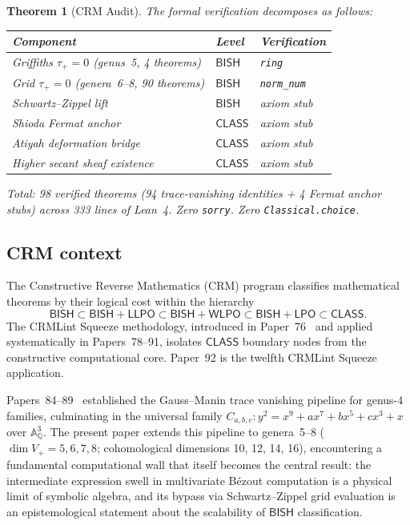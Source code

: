\documentclass[11pt]{article}
\theoremstyle{plain}
\newtheorem{theorem}{Theorem}[section]
\theoremstyle{definition}
\theoremstyle{remark}
\newcommand{\QQ}{\mathbb{Q}}
\newcommand{\Aff}{\mathbb{A}}
\newcommand{\BISH}{\mathsf{BISH}}
\newcommand{\LPO}{\mathsf{LPO}}
\newcommand{\WLPO}{\mathsf{WLPO}}
\newcommand{\LLPO}{\mathsf{LLPO}}
\newcommand{\CLASS}{\mathsf{CLASS}}
\begin{document}
\begin{theorem}[CRM Audit]\label{thm:D}
The formal verification decomposes as follows:
\begin{center}
\begin{tabular}{lll}
\toprule
\textbf{Component} & \textbf{Level} & \textbf{Verification} \\
\midrule
Griffiths $\tau_+ = 0$ (genus~5, 4 theorems) & $\BISH$ & \texttt{ring} \\
Grid $\tau_+ = 0$ (genera~6--8, 90 theorems) & $\BISH$ & \texttt{norm\_num} \\
Schwartz--Zippel lift & $\BISH$ & axiom stub \\
Shioda Fermat anchor & $\CLASS$ & axiom stub \\
Atiyah deformation bridge & $\CLASS$ & axiom stub \\
Higher secant sheaf existence & $\CLASS$ & axiom stub \\
\bottomrule
\end{tabular}
\end{center}
Total: 98 verified theorems (94 trace-vanishing identities + 4 Fermat anchor stubs) across 333 lines of Lean~4.
Zero \texttt{sorry}.  Zero \texttt{Classical.choice}.
\end{theorem}

\subsection{CRM context}

The Constructive Reverse Mathematics (CRM) program classifies mathematical
theorems by their logical cost within the hierarchy
\[
  \BISH \subset \BISH + \LLPO \subset \BISH + \WLPO
  \subset \BISH + \LPO \subset \CLASS.
\]
The CRMLint Squeeze methodology, introduced in Paper~76~\cite{P76} and
applied systematically in Papers~78--91, isolates $\CLASS$ boundary nodes
from the constructive computational core.  Paper~92 is the twelfth
CRMLint Squeeze application.

Papers~84--89~\cite{P84,P85,P86,P87,P88,P89} established the Gauss--Manin
trace vanishing pipeline for genus-4 families, culminating in the universal
family $C_{a,b,c}: y^2 = x^9 + ax^7 + bx^5 + cx^3 + x$ over
$\Aff^3_\QQ$.  The present paper extends this pipeline to genera~5--8
($\dim V_+ = 5, 6, 7, 8$; cohomological dimensions 10, 12, 14, 16),
encountering a fundamental computational wall that itself becomes the
central result: the intermediate expression swell in multivariate
B\'ezout computation is a physical limit of symbolic algebra, and its
bypass via Schwartz--Zippel grid evaluation is an epistemological
statement about the scalability of $\BISH$ classification.
\end{document}
